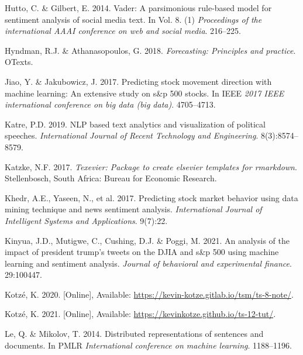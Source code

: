 \documentclass[11pt,preprint, authoryear]{elsarticle}
\numberwithin{equation}{section}
\numberwithin{figure}{section}
\numberwithin{table}{section}
\newlength{\cslhangindent}
\newenvironment{CSLReferences}%
  {\setlength{\parindent}{0pt}%
  \everypar{\setlength{\hangindent}{\cslhangindent}}\ignorespaces}%
  {\par}
\begin{document}
\begin{CSLReferences}{1}{0}
\leavevmode{}%
Hutto, C. \& Gilbert, E. 2014. Vader: A parsimonious rule-based model
for sentiment analysis of social media text. In Vol. 8. (1)
\emph{Proceedings of the international AAAI conference on web and social
media}. 216--225.

\leavevmode{}%
Hyndman, R.J. \& Athanasopoulos, G. 2018. \emph{Forecasting: Principles
and practice}. OTexts.

\leavevmode{}%
Jiao, Y. \& Jakubowicz, J. 2017. Predicting stock movement direction
with machine learning: An extensive study on s\&p 500 stocks. In IEEE
\emph{2017 IEEE international conference on big data (big data)}.
4705--4713.

\leavevmode{}%
Katre, P.D. 2019. NLP based text analytics and visualization of
political speeches. \emph{International Journal of Recent Technology and
Engineering}. 8(3):8574--8579.

\leavevmode{}%
Katzke, N.F. 2017. \emph{{Texevier}: {P}ackage to create elsevier
templates for rmarkdown}. Stellenbosch, South Africa: Bureau for
Economic Research.

\leavevmode{}%
Khedr, A.E., Yaseen, N., et al. 2017. Predicting stock market behavior
using data mining technique and news sentiment analysis.
\emph{International Journal of Intelligent Systems and Applications}.
9(7):22.

\leavevmode{}%
Kinyua, J.D., Mutigwe, C., Cushing, D.J. \& Poggi, M. 2021. An analysis
of the impact of president trump's tweets on the DJIA and s\&p 500 using
machine learning and sentiment analysis. \emph{Journal of behavioral and
experimental finance}. 29:100447.

\leavevmode{}%
Kotzé, K. 2020. {[}Online{]}, Available:
\url{https://kevin-kotze.gitlab.io/tsm/ts-8-note/}.

\leavevmode{}%
Kotzé, K. 2021. {[}Online{]}, Available:
\url{https://kevinkotze.github.io/ts-12-tut/}.

\leavevmode{}%
Le, Q. \& Mikolov, T. 2014. Distributed representations of sentences and
documents. In PMLR \emph{International conference on machine learning}.
1188--1196.


\end{CSLReferences}
\end{document}
